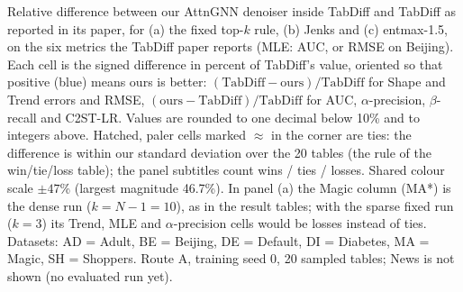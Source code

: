 Relative difference between our AttnGNN denoiser inside TabDiff and TabDiff as reported in its paper, for (a) the fixed top-$k$ rule, (b) Jenks and (c) entmax-1.5, on the six metrics the TabDiff paper reports (MLE: AUC, or RMSE on Beijing). Each cell is the signed difference in percent of TabDiff's value, oriented so that positive (blue) means ours is better: $(\text{TabDiff} - \text{ours})/\text{TabDiff}$ for Shape and Trend errors and RMSE, $(\text{ours} - \text{TabDiff})/\text{TabDiff}$ for AUC, $\alpha$-precision, $\beta$-recall and C2ST-LR. Values are rounded to one decimal below 10\% and to integers above. Hatched, paler cells marked $\approx$ in the corner are ties: the difference is within our standard deviation over the 20 tables (the rule of the win/tie/loss table); the panel subtitles count wins / ties / losses. Shared colour scale $\pm47$\% (largest magnitude 46.7\%). In panel (a) the Magic column (MA*) is the dense run ($k = N-1 = 10$), as in the result tables; with the sparse fixed run ($k=3$) its Trend, MLE and $\alpha$-precision cells would be losses instead of ties. Datasets: AD = Adult, BE = Beijing, DE = Default, DI = Diabetes, MA = Magic, SH = Shoppers. Route A, training seed 0, 20 sampled tables; News is not shown (no evaluated run yet).
